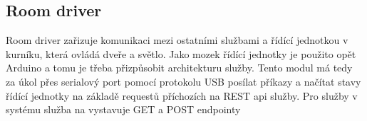 
\subsection{Room driver}\label{subsec:room-driver}
Room driver zařizuje komunikaci mezi ostatními službami a řídící jednotkou v kurníku, která ovládá dveře a světlo.\newline
Jako mozek řídící jednotky je použito opět Arduino a tomu je třeba přizpůsobit architekturu služby.
Tento modul má tedy za úkol přes serialový port pomocí protokolu USB posílat příkazy a načítat stavy řídící jednotky na základě requestů příchozích na REST api služby.
Pro služby v systému služba na vystavuje GET a POST endpointy
